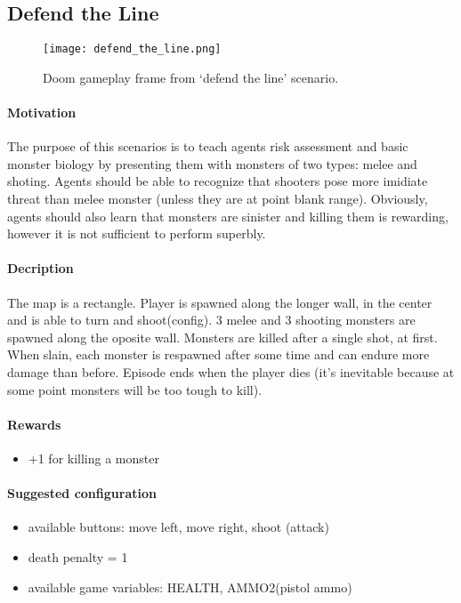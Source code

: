 	\subsection{Defend the Line}
		\begin{figure}
			\centering
			\texttt{[image: defend\_the\_line.png]}
			\caption{Doom gameplay frame from `defend the line' scenario.}\label{fig:defend_the_line}
		\end{figure}
		\paragraph{Motivation} 
			The purpose of this scenarios is to teach agents risk assessment and basic monster biology by presenting them with monsters of two types: melee and shoting. Agents should be able to recognize that shooters pose more imidiate threat than melee monster (unless they are at point blank range). Obviously, agents should also learn that monsters are sinister and killing them is rewarding, however it is not sufficient to perform superbly.
		\paragraph{Decription}
			The map is a rectangle. Player is spawned along the longer wall, in the center and is able to turn and shoot(config). 3 melee and 3 shooting monsters are spawned along the oposite wall. Monsters are killed after a single shot, at first. When slain, each monster is respawned after some time and can endure more damage than before. Episode ends when the player dies (it's inevitable because at some point monsters will be too tough to kill).
		\paragraph{Rewards}
			\begin{itemize}
				\item +1 for killing a monster
			\end{itemize}

		\paragraph{Suggested configuration}
			\begin{itemize}
				\item available buttons: move left, move right, shoot (attack)
				\item death penalty = 1
				\item available game variables: HEALTH, AMMO2(pistol ammo)
			\end{itemize}
	\newpage

